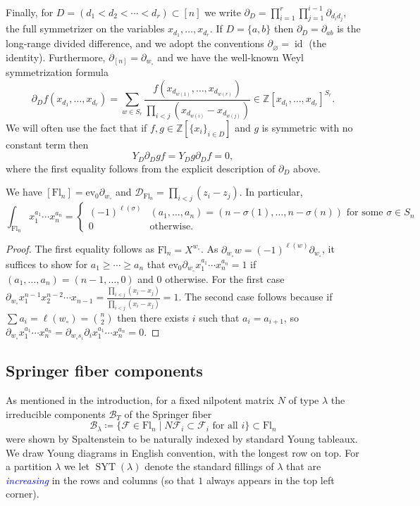 \documentclass[11pt]{amsart}
\renewcommand{\emptyset}{\varnothing}
\theoremstyle{definition}
\numberwithin{equation}{section}
\newcommand{\suchthat}{\;|\;}
\newcommand{\idem}{\operatorname{id}} %
\newcommand{\ct}{\operatorname{ev_0}} %
\newcommand{\fl}[1]{\mathrm{Fl}_{#1}}
\renewcommand\emph[1]{\textcolor{blue}{\textit{#1}}} %
\newcommand{\syt}{\operatorname{SYT}} %
\begin{document}
Finally, for $D=(d_1<d_2<\cdots<d_r)\subset [n]$ we write $\partial_D=\prod_{i=1}^r\prod_{j=1}^{i-1}\partial_{d_id_j}$, the full symmetrizer on the variables $x_{d_1},\ldots,x_{d_r}$.
If $D=\{a,b\}$ then $\partial_D=\partial_{ab}$ is the long-range divided difference, and we adopt the conventions $\partial_\emptyset=\idem$ (the identity).
Furthermore, $\partial_{[n]}=\partial_{w_\circ}$ and we have the well-known Weyl symmetrization formula $$\partial_Df(x_{d_1},\ldots,x_{d_r})=\sum_{w\in S_r}\frac{f(x_{d_{w(1)}},\ldots,x_{d_{w(r)}})}{\prod_{i<j}(x_{d_{w(i)}}-x_{d_{w(j)}})}\in \mathbb{Z}[x_{d_1},\ldots,x_{d_r}]^{S_r}.$$
We will often use the fact that if $f,g\in \mathbb{Z}[\{x_i\}_{i\in D}]$ and $g$ is symmetric with no constant term then
\begin{equation}
\label{eqn:pullsymthrough}Y_D\partial_D gf=Y_Dg\partial_Df=0,\end{equation}
where the first equality follows from the explicit description of $\partial_D$ above.

\begin{fact}
\label{fact:flagdel}
   We have
   $[\fl{n}]=\ct\partial_{w_{\circ}}$ and $\mathcal{D}_{\fl{n}}=\prod_{i<j}(z_i-z_j)$. In particular, $$\int_{\fl{n}}x_1^{a_1}\cdots x_n^{a_n}=\begin{cases}(-1)^{\ell(\sigma)}&(a_1,\ldots,a_n)=(n-\sigma(1),\ldots,n-\sigma(n))\text{ for some }\sigma\in S_n\\0&\text{otherwise.}\end{cases}$$
\end{fact}
\begin{proof}
    The first equality follows as $\fl{n}=X^{w_{\circ}}$.
    As $\partial_{w_{\circ}}w=(-1)^{\ell(w)}\partial_{w_{\circ}}$, it suffices to show for $a_1\ge \cdots \ge a_n$ that $\ct \partial_{w_{\circ}}x_{1}^{a_1}\cdots x_n^{a_n}=1$ if $(a_1,\ldots,a_n)=(n-1,\ldots,0)$ and $0$ otherwise.
    For the first case $\partial_{w_{\circ}} x_1^{n-1}x_2^{n-2}\cdots x_{n-1}=\frac{\prod_{i<j} (x_i-x_j)}{\prod_{i<j}(x_i-x_j)}=1$.
    The second case follows because if $\sum a_i=\ell(w_{\circ})=\binom{n}{2}$ then there exists $i$ such that $a_i=a_{i+1}$, so $\partial_{w_\circ}x_{1}^{a_1}\cdots x_n^{a_n}=\partial_{w_\circ s_i}\partial_ix_{1}^{a_1}\cdots x_n^{a_n}=0$.
\end{proof}


\subsection{Springer fiber components}
 As mentioned in the introduction, for a fixed nilpotent matrix $N$ of type $\lambda$ the irreducible components $\mathcal{B}_T$ of the Springer fiber $$\mathcal{B}_\lambda\coloneqq \{\mathcal{F}\in \fl{n}\suchthat N\mathcal{F}_i\subset \mathcal{F}_i\text{ for all $i$}\}\subset \fl{n}$$ were shown by Spaltenstein \cite{Spa76} to be naturally indexed by standard Young tableaux.
We draw Young diagrams in English convention, with the longest row on top.
For a partition $\lambda$ we let $\syt(\lambda)$ denote the standard fillings of $\lambda$ that are \emph{increasing} in the rows and columns (so that $1$ always appears in the top left corner).
\end{document}
